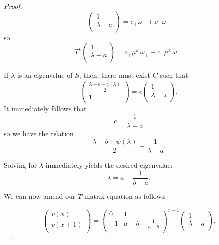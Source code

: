 \documentclass{article}
\numberwithin{equation}{section}
\numberwithin{theorem}{section}
\numberwithin{proposition}{section}
\numberwithin{lemma}{section}
\numberwithin{corollary}{section}
\numberwithin{definition}{section}
\begin{document}
\begin{proof}
\begin{equation*}
	\left(
	\begin{array}{c}
		1 \\
		\lambda - a \\
	\end{array}
	\right)
	=
	c_+ \omega_+ + c_- \omega_-
\end{equation*}
so
\begin{equation*}
	T^k \left(
	\begin{array}{c}
		1 \\
		\lambda - a \\
	\end{array}
	\right)
	=
	c_+ \mu_+^k \omega_+ + c_- \mu_-^k \omega_-.
\end{equation*}

If $\lambda$ is an eigenvalue of $S$, then, there must exist $C$ such that
\begin{equation*}
	\left(
	\begin{array}{c}
		\frac{\lambda - b + \psi(\lambda)}{2} \\
		1 \\
	\end{array}
	\right)
	=
	c \left(
	\begin{array}{c}
		1 \\
		\lambda - a \\
	\end{array}
	\right).
\end{equation*}
It immediately follows that
\begin{equation*}
	c = \frac{1}{\lambda - a}
\end{equation*}
so we have the relation
\begin{equation*}
	\frac{\lambda - b + \psi(\lambda)}{2} =  \frac{1}{\lambda - a}.
\end{equation*}

Solving for $\lambda$ immediately yields the desired eigenvalue:
\begin{equation}
	\lambda = a - \frac{1}{b-a}.
\end{equation}

We can now amend our $T$ matrix equation as follows:

\begin{equation*}
	\left(
	\begin{array}{c}
		v(x) \\
		v(x+1) \\
	\end{array}
	\right)
	=
	\left(
	\begin{array}{cc}
		0 & 1 \\
		-1 & a - b -\frac{1}{a-b} \\
	\end{array}
	\right)^{x-1}
	\left(
	\begin{array}{c}
		1 \\
		\lambda - a \\
	\end{array}
	\right).
\end{equation*}


\end{proof}
\end{document}
